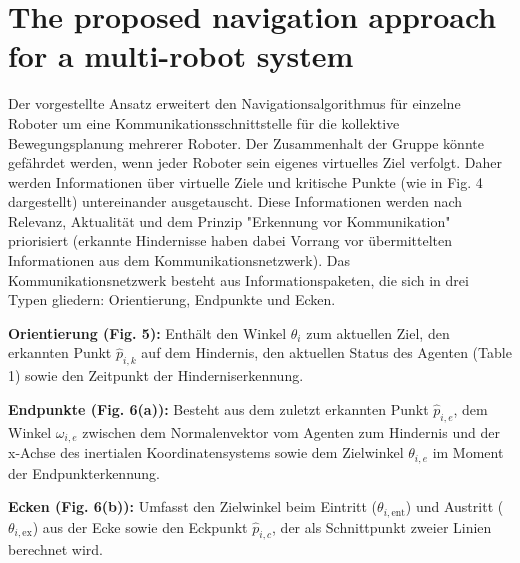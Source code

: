 \documentclass[conference]{IEEEtran}
\begin{document}
\section{The proposed navigation approach for a multi-robot system}
Der vorgestellte Ansatz erweitert den Navigationsalgorithmus für einzelne Roboter 
um eine Kommunikationsschnittstelle für die kollektive Bewegungsplanung mehrerer 
Roboter. Der Zusammenhalt der Gruppe könnte gefährdet werden, wenn jeder Roboter 
sein eigenes virtuelles Ziel verfolgt. Daher werden Informationen über virtuelle 
Ziele und kritische Punkte (wie in Fig. 4 dargestellt) untereinander ausgetauscht. 
Diese Informationen werden nach Relevanz, Aktualität und dem Prinzip "Erkennung vor 
Kommunikation" priorisiert (erkannte Hindernisse haben dabei Vorrang vor übermittelten 
Informationen aus dem Kommunikationsnetzwerk).
Das Kommunikationsnetzwerk besteht aus Informationspaketen, die sich in drei Typen 
gliedern: Orientierung, Endpunkte und Ecken.

\textbf{Orientierung (Fig. 5):} Enthält den Winkel \( \theta_i \) zum aktuellen Ziel, den erkannten 
Punkt \( \hat{p}_{i,k} \) auf dem Hindernis, den aktuellen Status des Agenten (Table 1) sowie den 
Zeitpunkt der Hinderniserkennung.

\textbf{Endpunkte (Fig. 6(a)):} Besteht aus dem zuletzt erkannten Punkt \( \hat{p}_{i,e} \), dem Winkel \( \omega_{i,e} \) 
zwischen dem Normalenvektor vom Agenten zum Hindernis und der x-Achse des inertialen 
Koordinatensystems sowie dem Zielwinkel \( \theta_{i,e} \) im Moment der Endpunkterkennung.

\textbf{Ecken (Fig. 6(b)):} Umfasst den Zielwinkel beim Eintritt (\( \theta_{i,\mathrm{ent}} \)) und Austritt 
(\( \theta_{i,\mathrm{ex}} \)) aus der Ecke sowie den Eckpunkt \( \hat{p}_{i,c} \), der als Schnittpunkt zweier 
Linien berechnet wird.
\end{document}
